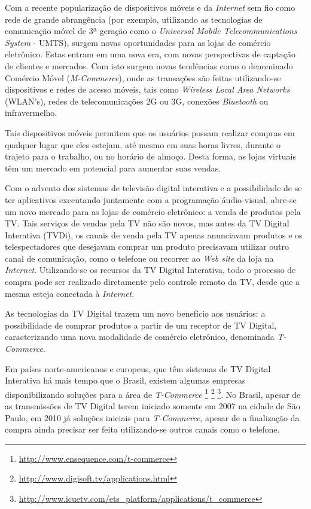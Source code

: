 Com a recente popularização de dispositivos móveis e da \textit{Internet} sem fio como rede de grande abrangência (por exemplo, utilizando as tecnologias
de comunicação móvel de 3ª geração como o \textit{Universal Mobile Telecommunications System} - UMTS), surgem novas oportunidades para as lojas de comércio eletrônico. 
Estas entram em uma nova era, com novas perspectivas de captação de clientes e mercados. Com isto surgem novas tendências 
como o denominado Comércio Móvel (\textit{M-Commerce}), onde as transações são feitas utilizando-se dispositivos e redes de acesso móveis, tais como \textit{Wireless Local Area Networks} (WLAN's), redes de telecomunicações 2G ou 3G, conexões \textit{Bluetooth} ou infravermelho\cite{veijalainen2006transaction}.

Tais dispositivos móveis permitem que os usuários possam realizar compras em qualquer lugar que eles estejam,
até mesmo em suas horas livres, durante o trajeto para o trabalho, ou no horário de almoço. Desta forma,
as lojas virtuais têm um mercado em potencial para aumentar suas vendas.

Com o advento dos sistemas de televisão digital interativa e a possibilidade de se ter 
aplicativos executando juntamente com a programação áudio-visual, abre-se um
novo mercado para as lojas de comércio eletrônico: a venda de produtos pela TV.
Tais serviços de vendas pela TV não são novos, mas antes da TV Digital Interativa (TVDi),
os canais de venda pela TV apenas anunciavam produtos e os telespectadores que 
desejavam comprar um produto precisavam utilizar outro canal de comunicação, como
o telefone ou recorrer ao \textit{Web site} da loja na \textit{Internet}.
Utilizando-se os recursos da TV Digital Interativa, todo o processo de compra
pode ser realizado diretamente pelo controle remoto da TV, desde que a mesma
esteja conectada à \textit{Internet}.

As tecnologias da TV Digital trazem um novo benefício aos usuários: a possibilidade
de comprar produtos a partir de um receptor de TV Digital, caracterizando uma nova modalidade de comércio
eletrônico, denominada \textit{T-Commerce}.

Em países norte-americanos e europeus, que têm sistemas de TV Digital Interativa
há mais tempo que o Brasil, existem algumas empresas disponibilizando soluções para a área de \textit{T-Commerce}
\footnote{\url{http://www.ensequence.com/t-commerce}}
\footnote{\url{http://www.digisoft.tv/applications.html}}
\footnote{\url{http://www.icuetv.com/ets\_platform/applications/t\_commerce}}.
No Brasil, apesar de as transmissões de TV Digital terem iniciado somente em 2007 
na cidade de São Paulo\cite{inicio-transmissao-tv-digital-saopaulo}, em 2010
já  soluções iniciais para \textit{T-Commerce}\cite{extra-vendas-tvd}, apesar de a finalização
da compra ainda precisar ser feita utilizando-se outros canais como o telefone.

